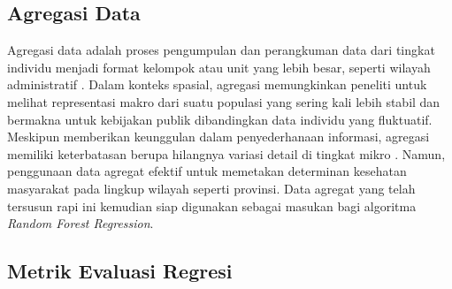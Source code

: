 \subsection{Agregasi Data}
Agregasi data adalah proses pengumpulan dan perangkuman data dari tingkat individu menjadi format kelompok atau unit yang lebih besar, seperti wilayah administratif \cite{james2021islr}. Dalam konteks spasial, agregasi memungkinkan peneliti untuk melihat representasi makro dari suatu populasi yang sering kali lebih stabil dan bermakna untuk kebijakan publik dibandingkan data individu yang fluktuatif. Meskipun memberikan keunggulan dalam penyederhanaan informasi, agregasi memiliki keterbatasan berupa hilangnya variasi detail di tingkat mikro \cite{id2021machine}. Namun, penggunaan data agregat efektif untuk memetakan determinan kesehatan masyarakat pada lingkup wilayah seperti provinsi. Data agregat yang telah tersusun rapi ini kemudian siap digunakan sebagai masukan bagi algoritma \textit{Random Forest Regression}.

\subsection{Metrik Evaluasi Regresi}

